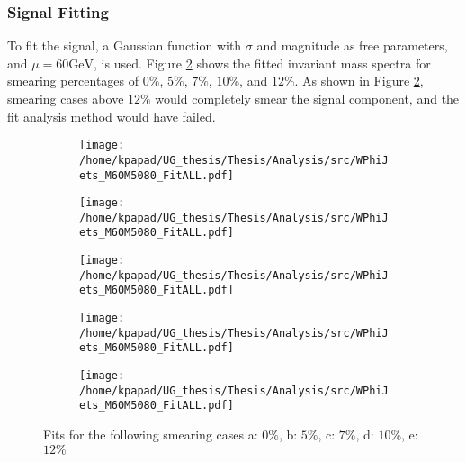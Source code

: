 \subsubsection{Signal Fitting}
\label{sec:org3f85c70}
\label{sec:Light_signal_fitting}
To fit the signal, a Gaussian function with \(\sigma\) and magnitude as free parameters, and \(\mu = 60\text{GeV}\), is used. Figure \ref{fig:Lightfits} shows the fitted invariant mass spectra for smearing percentages of \(0\%\), \(5\%\), \(7\%\), \(10\%\), and \(12\%\). As shown in Figure \ref{fig:Lightfits}, smearing cases above \(12\%\) would completely smear the signal component, and the fit analysis method would have failed.

\begin{figure}[htpb]
\centering
\begin{subfigure}{0.45\textwidth}
\centering
\texttt{[image: /home/kpapad/UG\_thesis/Thesis/Analysis/src/WPhiJets\_M60M5080\_FitALL.pdf]}
\caption{}
\end{subfigure}
\begin{subfigure}{0.45\textwidth}
\centering
\texttt{[image: /home/kpapad/UG\_thesis/Thesis/Analysis/src/WPhiJets\_M60M5080\_FitALL.pdf]}
\caption{}
\end{subfigure}

\begin{subfigure}{0.45\textwidth}
\centering
\texttt{[image: /home/kpapad/UG\_thesis/Thesis/Analysis/src/WPhiJets\_M60M5080\_FitALL.pdf]}
\caption{}
\end{subfigure}
\begin{subfigure}{0.45\textwidth}
\centering
\texttt{[image: /home/kpapad/UG\_thesis/Thesis/Analysis/src/WPhiJets\_M60M5080\_FitALL.pdf]}
\caption{}
\label{suigure}
\end{subfigure}

\begin{subfigure}{0.45\textwidth}
\centering
\texttt{[image: /home/kpapad/UG\_thesis/Thesis/Analysis/src/WPhiJets\_M60M5080\_FitALL.pdf]}
\caption{}
\end{subfigure}
\caption{Fits for the following smearing cases a: $0\%$, b: $5\%$, c: $7\%$, d: $10\%$, e: $12\%$}
\label{fig:Lightfits}
\end{figure}

